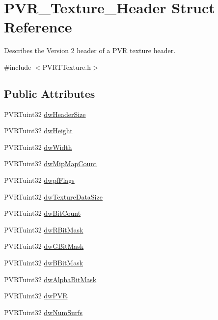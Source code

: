 \hypertarget{struct_p_v_r___texture___header}{\section{P\+V\+R\+\_\+\+Texture\+\_\+\+Header Struct Reference}
\label{struct_p_v_r___texture___header}
}


Describes the Version 2 header of a P\+V\+R texture header.  




{\ttfamily \#include $<$P\+V\+R\+T\+Texture.\+h$>$}

\subsection*{Public Attributes}
\begin{DoxyCompactItemize}
\item 
P\+V\+R\+Tuint32 \hyperlink{struct_p_v_r___texture___header_a08132ef78a2d3bf45f814dbf7bfc954c}{dw\+Header\+Size}
\item 
P\+V\+R\+Tuint32 \hyperlink{struct_p_v_r___texture___header_aa27340dc3ec51e89689679aede88fd9c}{dw\+Height}
\item 
P\+V\+R\+Tuint32 \hyperlink{struct_p_v_r___texture___header_af50d1792b2bb0c6e78d827644ef44aad}{dw\+Width}
\item 
P\+V\+R\+Tuint32 \hyperlink{struct_p_v_r___texture___header_a42ff87a8aa5e04190d3cc62160962cd3}{dw\+Mip\+Map\+Count}
\item 
P\+V\+R\+Tuint32 \hyperlink{struct_p_v_r___texture___header_a5e5b584c49798aeffea0ee25a1c55019}{dwpf\+Flags}
\item 
P\+V\+R\+Tuint32 \hyperlink{struct_p_v_r___texture___header_a4dfcf1a126ee880b9a8fdbbd9214b71a}{dw\+Texture\+Data\+Size}
\item 
P\+V\+R\+Tuint32 \hyperlink{struct_p_v_r___texture___header_ae2c37c28d0442ab00c4a860cc8240e14}{dw\+Bit\+Count}
\item 
P\+V\+R\+Tuint32 \hyperlink{struct_p_v_r___texture___header_ae0c5f4ecec509d383e8279174f060223}{dw\+R\+Bit\+Mask}
\item 
P\+V\+R\+Tuint32 \hyperlink{struct_p_v_r___texture___header_aaad072521ec185cd73c58b6598ab7973}{dw\+G\+Bit\+Mask}
\item 
P\+V\+R\+Tuint32 \hyperlink{struct_p_v_r___texture___header_ae4bf9b63a63468bc73ed2afe27dc1560}{dw\+B\+Bit\+Mask}
\item 
P\+V\+R\+Tuint32 \hyperlink{struct_p_v_r___texture___header_a0730c4fe3dbf1550d163d8ed94e642cf}{dw\+Alpha\+Bit\+Mask}
\item 
P\+V\+R\+Tuint32 \hyperlink{struct_p_v_r___texture___header_a97a44950be630b5f67ad62cd94648f5f}{dw\+P\+V\+R}
\item 
P\+V\+R\+Tuint32 \hyperlink{struct_p_v_r___texture___header_a9935bb426fcdb2b1ec3fab9fab003a98}{dw\+Num\+Surfs}
\end{DoxyCompactItemize}


